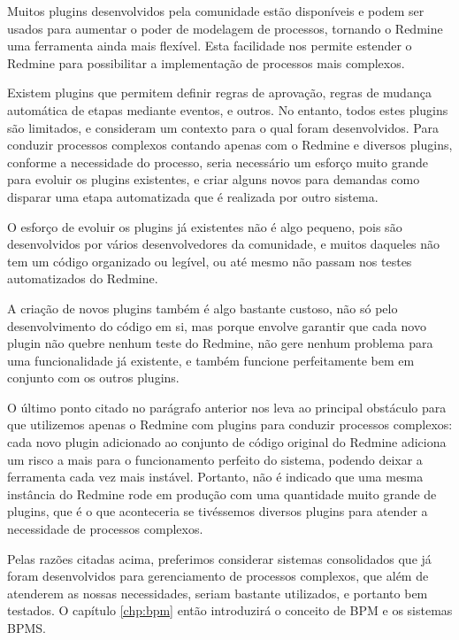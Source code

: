 Muitos plugins desenvolvidos pela comunidade estão disponíveis e podem ser usados para aumentar o poder de modelagem de processos, tornando o Redmine uma ferramenta ainda mais flexível. Esta facilidade nos permite estender o Redmine para possibilitar a implementação de processos mais complexos.

Existem plugins que permitem definir regras de aprovação, regras de mudança automática de etapas mediante eventos, e outros. No entanto, todos estes plugins são limitados, e consideram um contexto para o qual foram desenvolvidos. Para conduzir processos complexos contando apenas com o Redmine e diversos plugins, conforme a necessidade do processo, seria necessário um esforço muito grande para evoluir os plugins existentes, e criar alguns novos para demandas como disparar uma etapa automatizada que é realizada por outro sistema. 

O esforço de evoluir os plugins já existentes não é algo pequeno, pois são desenvolvidos por vários desenvolvedores da comunidade, e muitos daqueles não tem um código organizado ou legível, ou até mesmo não passam nos testes automatizados do Redmine.

A criação de novos plugins também é algo bastante custoso, não só pelo desenvolvimento do código em si, mas porque envolve garantir que cada novo plugin não quebre nenhum teste do Redmine, não gere nenhum problema para uma funcionalidade já existente, e também funcione perfeitamente bem em conjunto com os outros plugins.

O último ponto citado no parágrafo anterior nos leva ao principal obstáculo para que utilizemos apenas o Redmine com plugins para conduzir processos complexos: cada novo plugin adicionado ao conjunto de código original do Redmine adiciona um risco a mais para o funcionamento perfeito do sistema, podendo deixar a ferramenta cada vez mais instável. Portanto, não é indicado que uma mesma instância do Redmine rode em produção com uma quantidade muito grande de plugins, que é o que aconteceria se tivéssemos diversos plugins para atender a necessidade de processos complexos.

Pelas razões citadas acima, preferimos considerar sistemas consolidados que já foram desenvolvidos para gerenciamento de processos complexos, que além de atenderem as nossas necessidades, seriam bastante utilizados, e portanto bem testados. O capítulo \ref{chp:bpm} então introduzirá o conceito de BPM e os sistemas BPMS.